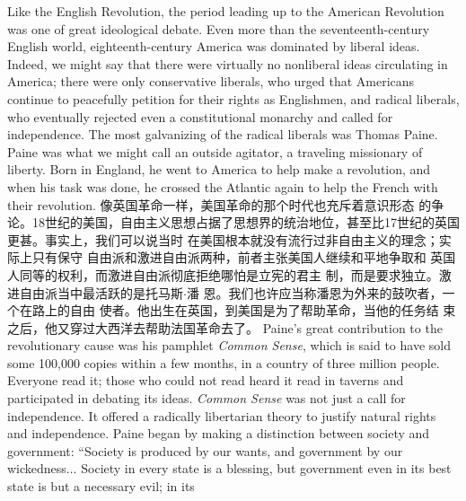 \begin{paracol}{2}
Like the English Revolution, the period leading up to the American Revolution was one of great ideological debate. Even more
than the seventeenth-century English world, eighteenth-century America was dominated by liberal ideas. Indeed, we might say that there were virtually no nonliberal ideas circulating in
America; there were only conservative liberals, who urged that
Americans continue to peacefully petition for their rights as
Englishmen, and radical liberals, who eventually rejected even a
constitutional monarchy and called for independence. The most
galvanizing of the radical liberals was Thomas Paine. Paine was
what we might call an outside agitator, a traveling missionary of
liberty. Born in England, he went to America to help make a
revolution, and when his task was done, he crossed the Atlantic
again to help the French with their revolution.
\switchcolumn
像英国革命一样，美国革命的那个时代也充斥着意识形态
的争论。18世纪的美国，自由主义思想占据了思想界的统治地位，甚至比17世纪的英国更甚。事实上，我们可以说当时
在美国根本就没有流行过非自由主义的理念；实际上只有保守
自由派和激进自由派两种，前者主张美国人继续和平地争取和
英国人同等的权利，而激进自由派彻底拒绝哪怕是立宪的君主
制，而是要求独立。激进自由派当中最活跃的是托马斯$\cdot$潘
恩。我们也许应当称潘恩为外来的鼓吹者，一个在路上的自由
使者。他出生在英国，到美国是为了帮助革命，当他的任务结
束之后，他又穿过大西洋去帮助法国革命去了。
Paine's great contribution to the revolutionary cause was his
pamphlet \textit{Common Sense}, which is said to have sold some
100,000 copies within a few months, in a country of three million people. Everyone read it; those who could not read heard it read in taverns and participated in debating its ideas. \textit{Common Sense} was not just a call for independence. It offered a radically libertarian theory to justify natural rights and independence.
Paine began by making a distinction between society and government: ``Society is produced by our wants, and government by our wickedness$\ldots$ Society in every state is a blessing, but
government even in its best state is but a necessary evil; in its

\end{paracol}
